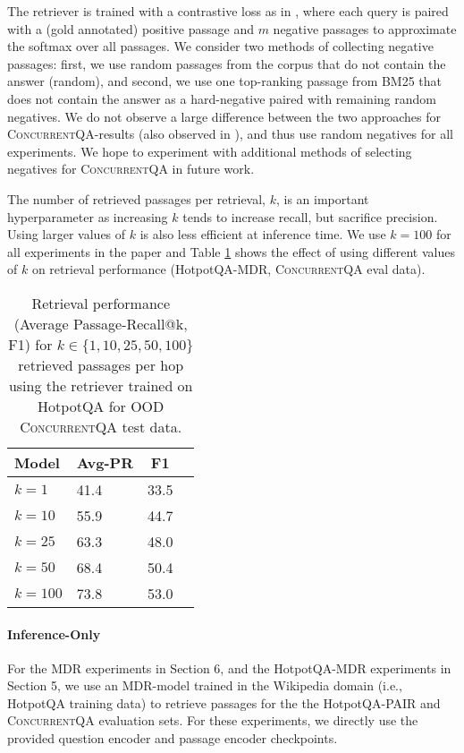 \documentclass{article}
\renewcommand\cite{\citep}	\newcommand\shortcite{\citeyearpar}\newcommand\newcite{\citet}
\newcommand{\datasetname}{\textsc{ConcurrentQA}\xspace}
\newcommand{\problemshortname}{\textsc{PAIR}\xspace}
\begin{document}
The retriever is trained with a contrastive loss as in \citet{karpukhin2020dpr}, where each query is paired with a (gold annotated) positive passage and $m$ negative passages to approximate the softmax over all passages. We consider two methods of collecting negative passages: first, we use random passages from the corpus that do not contain the answer (random), and second, we use one top-ranking passage from BM25 that does not contain the answer as a hard-negative paired with remaining random negatives. We do not observe a large difference between the two approaches for \datasetname-results (also observed in \cite{xiong2021mdr}), and thus use random negatives for all experiments. We hope to experiment with additional methods of selecting negatives for \datasetname in future work.


The number of retrieved passages per retrieval, $k$, is an important hyperparameter as increasing $k$ tends to increase recall, but sacrifice precision. Using larger values of $k$ is also less efficient at inference time. We use $k=100$ for all experiments in the paper and Table \ref{tab:mdr_varyk} shows the effect of using different values of $k$ on retrieval performance (HotpotQA-MDR, \datasetname eval data).

\begin{table}[t!]
    \begin{center}
    \normalsize
    \begin{tabular}{llcc}
    \toprule
    Model  &    Avg-PR   & F1 \\
    \midrule
    $k=1$       & 41.4  & 33.5 \\
    $k=10$      & 55.9 &  44.7 \\
    $k=25$      & 63.3  & 48.0 \\
    $k=50$      & 68.4  & 50.4 \\
    $k=100$     & 73.8  & 53.0 \\
    \bottomrule
    \end{tabular}
    \normalsize
    \caption{Retrieval performance (Average Passage-Recall@k, F1) for $k \in \{1, 10, 25, 50, 100\}$ retrieved passages per hop using the retriever trained on HotpotQA for OOD \datasetname test data.}
    \vspace{2mm}
    \label{tab:mdr_varyk}
    \end{center}
\end{table}
\paragraph{Inference-Only} For the MDR experiments in Section 6, and the HotpotQA-MDR experiments in Section 5, we use an MDR-model trained in the Wikipedia domain (i.e., HotpotQA training data) to retrieve passages for the the HotpotQA-\problemshortname and \datasetname evaluation sets. For these experiments, we directly use the provided question encoder and passage encoder checkpoints. 
\end{document}
